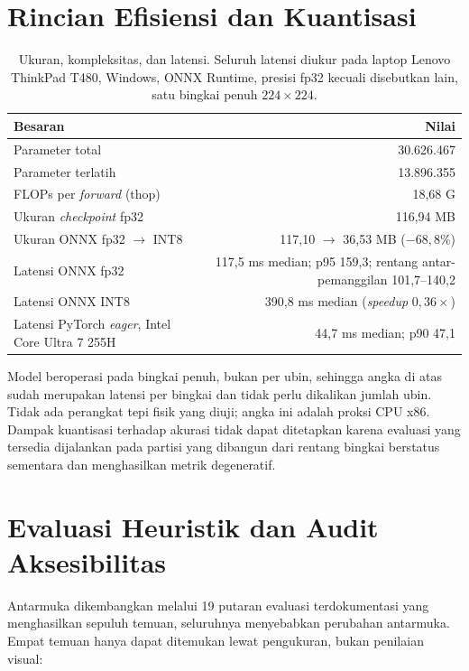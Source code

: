\section{Rincian Efisiensi dan Kuantisasi}
\label{app:efisiensi}

\begin{table}[h]
\caption{Ukuran, kompleksitas, dan latensi. Seluruh latensi diukur pada laptop
Lenovo ThinkPad T480, Windows, ONNX Runtime, presisi fp32 kecuali disebutkan
lain, satu bingkai penuh $224 \times 224$.}
\centering
\small
\begin{tabular}{lr}
\hline
\textbf{Besaran} & \textbf{Nilai} \\
\hline
Parameter total & 30.626.467 \\
Parameter terlatih & 13.896.355 \\
FLOPs per \emph{forward} (thop) & 18{,}68 G \\
Ukuran \emph{checkpoint} fp32 & 116{,}94 MB \\
Ukuran ONNX fp32 $\rightarrow$ INT8 & 117{,}10 $\rightarrow$ 36{,}53 MB ($-68{,}8\%$) \\
Latensi ONNX fp32 & 117{,}5 ms median; p95 159{,}3; rentang antar-pemanggilan 101{,}7--140{,}2 \\
Latensi ONNX INT8 & 390{,}8 ms median (\emph{speedup} $0{,}36\times$) \\
Latensi PyTorch \emph{eager}, Intel Core Ultra 7 255H & 44{,}7 ms median; p90 47{,}1 \\
\hline
\end{tabular}
\end{table}

Model beroperasi pada bingkai penuh, bukan per ubin, sehingga angka di atas
sudah merupakan latensi per bingkai dan tidak perlu dikalikan jumlah ubin.
Tidak ada perangkat tepi fisik yang diuji; angka ini adalah proksi CPU x86.
Dampak kuantisasi terhadap akurasi tidak dapat ditetapkan karena evaluasi yang
tersedia dijalankan pada partisi yang dibangun dari rentang bingkai berstatus
sementara dan menghasilkan metrik degeneratif.

\section{Evaluasi Heuristik dan Audit Aksesibilitas}
\label{app:heuristik}

Antarmuka dikembangkan melalui 19 putaran evaluasi terdokumentasi yang
menghasilkan sepuluh temuan, seluruhnya menyebabkan perubahan antarmuka. Empat
temuan hanya dapat ditemukan lewat pengukuran, bukan penilaian visual:

